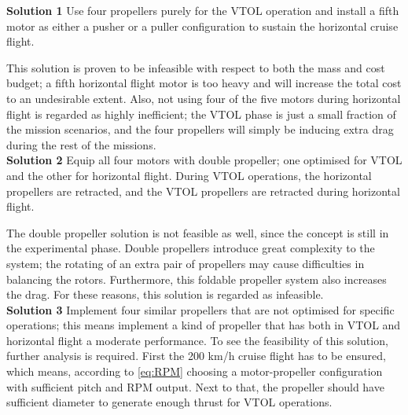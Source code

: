 \noindent \textbf{Solution 1} Use four propellers purely for the VTOL operation and install a fifth motor as either a pusher or a puller configuration to sustain the horizontal cruise flight. 

This solution is proven to be infeasible with respect to both the mass and cost budget; a fifth horizontal flight motor is too heavy and will increase the total cost to an undesirable extent. Also, not using four of the five motors during horizontal flight is regarded as highly inefficient; the VTOL phase is just a small fraction of the mission scenarios, and the four propellers will simply be inducing extra drag during the rest of the missions.\\

\noindent \textbf{Solution 2} Equip all four motors with double propeller; one optimised for VTOL and the other for horizontal flight. During VTOL operations, the horizontal propellers are retracted, and the VTOL propellers are retracted during horizontal flight.

The double propeller solution is not feasible as well, since the concept is still in the experimental phase. Double propellers introduce great complexity to the system; the rotating of an extra pair of propellers may cause difficulties in balancing the rotors. Furthermore, this foldable propeller system also increases the drag. For these reasons, this solution is regarded as infeasible.\\

\noindent \textbf{Solution 3} Implement four similar propellers that are not optimised for specific operations; this means implement a kind of propeller that has both in VTOL and horizontal flight a moderate performance. To see the feasibility of this solution, further analysis is required. First the 200 km/h cruise flight has to be ensured, which means, according to \autoref{eq:RPM} choosing a motor-propeller configuration with sufficient pitch and RPM output. Next to that, the propeller should have sufficient diameter to generate enough thrust for VTOL operations.

